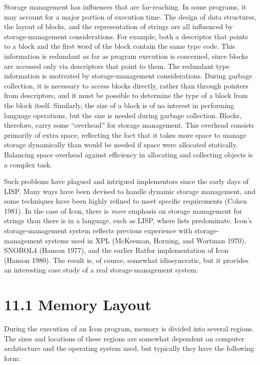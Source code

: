 Storage management has influences that are far-reaching. In some
programs, it may account for a major portion of execution time. The
design of data structures, the layout of blocks, and the
representation of strings are all influenced by storage-management
considerations. For example, both a descriptor that points to a block
and the first word of the block contain the same type code. This
information is redundant as far as program execution is concerned,
since blocks are accessed only via descriptors that point to them. The
redundant type information is motivated by storage-management
considerations. During garbage collection, it is necessary to access
blocks directly, rather than through pointers from descriptors, and it
must be possible to determine the type of a block from the block
itself.  Similarly, the size of a block is of no interest in
performing language operations, but the size is needed during garbage
collection. Blocks, therefore, carry some ``overhead'' for storage
management. This overhead consists primarily of extra space,
reflecting the fact that it takes more space to manage storage
dynamically than would be needed if space were allocated
statically. Balancing space overhead against efficiency in allocating
and collecting objects is a complex task.

Such problems have plagued and intrigued implementors since the early
days of LISP. Many ways have been devised to handle dynamic storage
management, and some techniques have been highly refined to meet
specific requirements (Cohen 1981). In the case of Icon, there is
\textit{more }emphasis on storage management for strings than there is
in a language, such as LISP, where lists predominate. Icon's
storage-management system reflects previous experience with
storage-management systems used in XPL (McKeeman, Horning, and Wortman
1970), SNOBOL4 (Hanson 1977), and the earlier Ratfor implementation of
Icon (Hanson 1980). The result is, of course, somewhat idiosyncratic,
but it provides an interesting case study of a real storage-management
system.

\section[11.1 Memory Layout]{11.1 Memory Layout}

During the execution of an Icon program, memory is divided into
several regions. The sizes and locations of these regions are somewhat
dependent on computer architecture and the operating system used, but
typically they have the following form:

